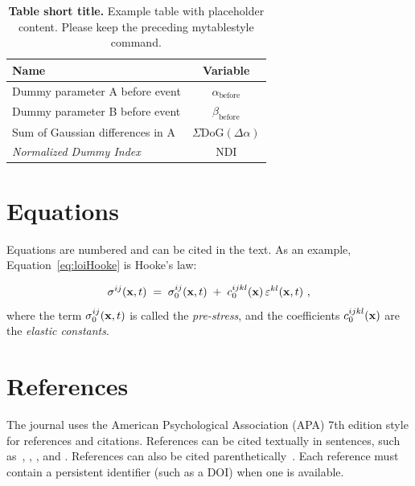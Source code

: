 \documentclass[article,review]{planetary}
\begin{document}
\begin{table}[!ht]
    \mytablestyle
    \caption{{\bf Table short title.} Example table with placeholder content. Please keep the preceding mytablestyle command.}
    \footnotesize{
        \begin{tabular}{l c}
            \toprule
            \textbf{Name} & \textbf{Variable} \\
            \hline
            Dummy parameter A before event & $\alpha_{\text{before}}$ \\
            Dummy parameter B before event & $\beta_{\text{before}}$ \\
            Sum of Gaussian differences in A & $\Sigma\text{DoG}(\Delta\alpha)$ \\
            \textit{Normalized Dummy Index} & NDI \\
            \hline
        \end{tabular}}
        \label{tab:example_dummy}
\end{table}

\section{Equations}

Equations are numbered and can be cited in the text. As an example, Equation~\eqref{eq:loiHooke} is Hooke's law:

\begin{equation}
     \sigma^{ij}({\bf x},t)
     \;=\;
     \sigma_0^{ij}({\bf x},t)
     \;+\;
     c_0^{ijkl}({\bf x})
     \,
     \varepsilon^{kl}({\bf x},t)\ ,
     \label{eq:loiHooke}
\end{equation}
where the term
$\sigma_0^{ij}({\bf x},t)$ is called the \emph{pre-stress}, and the coefficients $c_0^{ijkl}({\bf x})$ are the \emph{elastic constants}.

\section{References}
The journal uses the American Psychological Association (APA) 7th edition style for references and citations. References can be cited textually in sentences, such as~\textcite{becker2015phd}, \textcite{Rudolph2020}, \textcite{bagnasco2017nirspec}, and \textcite{Breuer2015}. References can also be cited parenthetically~\parencites{dressler2006nasa,Neukumetal2001a,Wieczorek2022-preprint,SJOGRENdataset}. Each reference must contain a persistent identifier (such as a DOI) when one is available.
\end{document}
